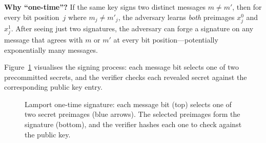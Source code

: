\begin{svgraybox}
\textbf{Why ``one-time''?}  If the same key signs two distinct messages $m \neq m'$, then for every bit position~$j$ where $m_j \neq m'_j$, the adversary learns \emph{both} preimages $x_j^0$ and $x_j^1$.  After seeing just two signatures, the adversary can forge a signature on any message that agrees with $m$ or $m'$ at every bit position---potentially exponentially many messages.
\end{svgraybox}

Figure~\ref{fig:ch10-lamport} visualises the signing process: each message bit selects one of two precommitted secrets, and the verifier checks each revealed secret against the corresponding public key entry.

\begin{figure}[t]
\centering
{}
\caption{Lamport one-time signature: each message bit (top) selects one of two secret preimages (blue arrows).  The selected preimages form the signature (bottom), and the verifier hashes each one to check against the public key.}
\label{fig:ch10-lamport}
\end{figure}

